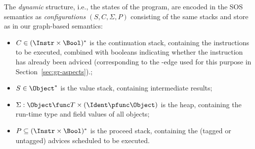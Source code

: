 The \emph{dynamic} structure, i.e., the states of the program, are encoded in
the SOS semantics as \emph{configurations} $(S,C,\Sigma,P)$ consisting of the
same stacks and store as in our graph-based semantics:
%
\begin{itemize}\itemsep0pt
\item $C \in (\Instr\times \Bool)^*$ is the continuation stack, containing the
  instructions to be executed, combined with booleans indicating whether the
  instruction has already been adviced (corresponding to the \tagL{}-edge used for
  this purpose in Section~\ref{sec:gr-aspects}).;
\item $S \in \Object^*$ is the value stack, containing intermediate results;
\item $\Sigma: \Object \func T\times (\Ident \pfunc \Object)$ is the heap, containing
  the run-time type and field values of all objects;
\item $P\subseteq (\Instr\times \Bool)^*$ is the proceed stack, containing the
  (tagged or untagged) advices scheduled to be executed.
\end{itemize}

